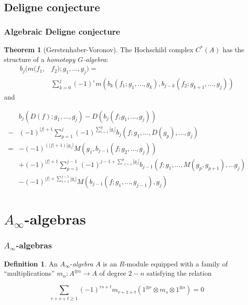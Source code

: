\documentclass{beamer}
\theoremstyle{definition}
\newtheorem{theo}{Theorem}
\newtheorem{defi}{Definition}
\begin{document}
\subsection{Deligne conjecture}
\begin{frame}
\frametitle{Algebraic Deligne conjecture}
\begin{theo}[Gerstenhaber-Voronov]
 The Hochschild complex $C^*(A)$ has the structure of a \emph{homotopy $G$-algebra}:\pause
 \begin{align*}
 b_j(m(f_1,&f_2);g_1,\dots,g_j) = \\
 &\sum_{k=0}^j (-1)^\varepsilon m(b_k(f_1;g_1,\dots, g_k),b_{j-k}(f_2;g_{k+1},\dots, g_j))
 \end{align*}
 and
\end{theo}
\end{frame}
\begin{frame}
\begin{block}{}
 \begin{align*}
&b_j(D(f);g_1,\dots, g_j)-D(b_j(f;g_1,\dots,g_j))\\
-&(-1)^{|f|+1}\sum_{p=1}^j(-1)^{\sum_{i=1}^p|g_i|}b_j(f;g_1,\dots,D(g_p),\dots, g_j)\\
=&-(-1)^{(|f|+1)|g_1|}M(g_1,b_{j-1}(f;g_2,\dots, g_j))\\
 &+(-1)^{|f|+1}\sum_{p=1}^{j-1}(-1)^{j-1+\underset{i=1}{\overset{p}{\sum}}|g_i|}b_{j-1}(f;g_1,\dots,M(g_p,g_{p+1}),\dots g_j)\\
 &-(-1)^{|f|+\sum_{i=1}^{j-1}|g_i|}M(b_{j-1}(f;g_1,\dots, g_{j-1}),g_j)
\end{align*}
\end{block}
\end{frame}


\section{$A_\infty$-algebras}


\begin{frame}
\frametitle{$A_\infty$-algebras}
\begin{defi}
An $A_\infty$-\emph{algebra} $A$ is an $R$-module equipped with a family of ``multiplications'' $m_n:A^{\otimes n}\to A$ of degree $2-n$ satisfying the relation %

\[\sum_{r+s+t\geq 1}(-1)^{rs+t}m_{r+1+t}(1^{\otimes r}\otimes m_s\otimes 1^{\otimes s})=0\] %
\end{defi}
\end{frame}
\end{document}
